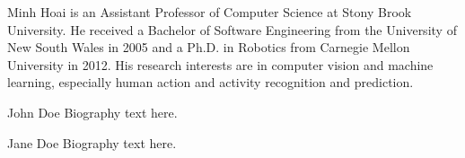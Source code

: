 \documentclass[10pt,journal,compsoc]{IEEEtran}
\begin{document}
 \begin{IEEEbiography}{Minh Hoai}
is an Assistant Professor of Computer Science at Stony Brook University. He received a Bachelor of Software Engineering from the University of New South Wales in 2005 and a Ph.D. in Robotics from Carnegie Mellon University in 2012. His research interests are in computer vision and machine learning, especially human action and activity recognition and prediction. 
\end{IEEEbiography}

\begin{IEEEbiographynophoto}{John Doe}
Biography text here.
\end{IEEEbiographynophoto}



\begin{IEEEbiographynophoto}{Jane Doe}
Biography text here.
\end{IEEEbiographynophoto}






\end{document}
